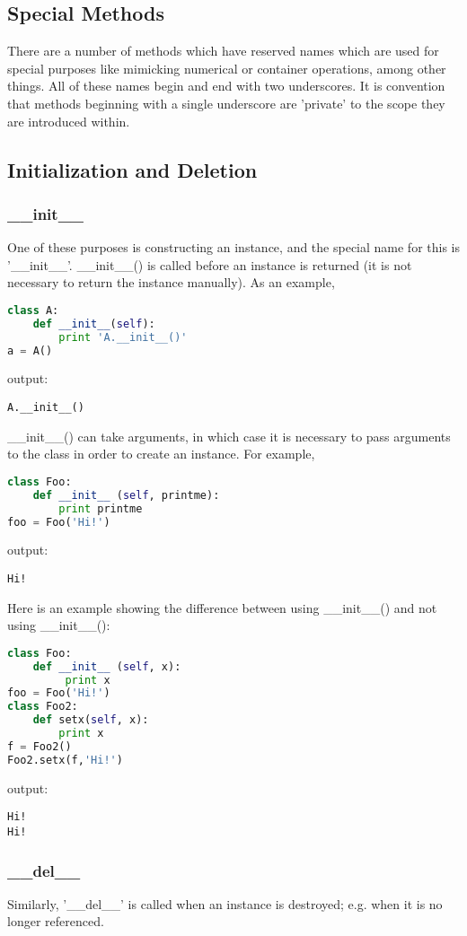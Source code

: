 \subsection{Special Methods}
There are a number of methods which have reserved names which are used for
special purposes like mimicking numerical or container operations, among other
things. All of these names begin and end with two underscores. It is convention
that methods beginning with a single underscore are 'private' to the scope they
are introduced within.

\subsection{Initialization and Deletion}
\subsubsection{\_\_init\_\_}
One of these purposes is constructing an instance, and the special name for this
is '\_\_init\_\_'. \_\_init\_\_() is called before an instance is returned (it is not
necessary to return the instance manually). As an example,
\lstset{basicstyle=\scriptsize, numbers=left, captionpos=b, tabsize=4}
\begin{lstlisting}[caption=Init Methode,language={Python},
xleftmargin=15pt, label=lst:initmethode]
class A:
    def __init__(self):
        print 'A.__init__()'
a = A()
\end{lstlisting}

output:
\scriptsize
\begin{verbatim}
A.__init__()
\end{verbatim}
\normalsize
\_\_init\_\_() can take arguments, in which case it is necessary to pass arguments
to the class in order to create an instance. For example,
\lstset{basicstyle=\scriptsize, numbers=left, captionpos=b, tabsize=4}
\begin{lstlisting}[caption=Init Arguments,language={Python},
xleftmargin=15pt, label=lst:initarguments]
class Foo:
    def __init__ (self, printme):
        print printme
foo = Foo('Hi!')
\end{lstlisting}

output:
\scriptsize
\begin{verbatim}
Hi!
\end{verbatim}
\normalsize

Here is an example showing the difference between using \_\_init\_\_() and not using
\_\_init\_\_():
\lstset{basicstyle=\scriptsize, numbers=left, captionpos=b, tabsize=4}
\begin{lstlisting}[caption=Difference,language={Python},
xleftmargin=15pt, label=lst:difference]
class Foo:
    def __init__ (self, x):
         print x
foo = Foo('Hi!')
class Foo2:
    def setx(self, x):
        print x
f = Foo2()
Foo2.setx(f,'Hi!')
\end{lstlisting}
output:
\scriptsize
\begin{verbatim}
Hi!
Hi!
\end{verbatim}
\normalsize

\subsubsection{\_\_del\_\_}
Similarly, '\_\_del\_\_' is called when an instance is destroyed; e.g. when it
is no longer referenced.
